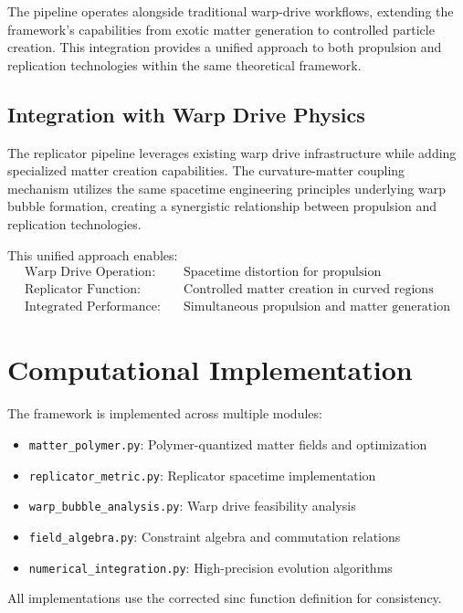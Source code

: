 \documentclass[11pt]{article}
\begin{document}
The pipeline operates alongside traditional warp-drive workflows, extending the framework's capabilities from exotic matter generation to controlled particle creation. This integration provides a unified approach to both propulsion and replication technologies within the same theoretical framework.

\subsection{Integration with Warp Drive Physics}

The replicator pipeline leverages existing warp drive infrastructure while adding specialized matter creation capabilities. The curvature-matter coupling mechanism utilizes the same spacetime engineering principles underlying warp bubble formation, creating a synergistic relationship between propulsion and replication technologies.

This unified approach enables:
\begin{align}
\text{Warp Drive Operation:} &\quad \text{Spacetime distortion for propulsion} \\
\text{Replicator Function:} &\quad \text{Controlled matter creation in curved regions} \\
\text{Integrated Performance:} &\quad \text{Simultaneous propulsion and matter generation}
\end{align}

\section{Computational Implementation}

The framework is implemented across multiple modules:

\begin{itemize}
\item \texttt{matter\_polymer.py}: Polymer-quantized matter fields and optimization
\item \texttt{replicator\_metric.py}: Replicator spacetime implementation
\item \texttt{warp\_bubble\_analysis.py}: Warp drive feasibility analysis
\item \texttt{field\_algebra.py}: Constraint algebra and commutation relations
\item \texttt{numerical\_integration.py}: High-precision evolution algorithms
\end{itemize}

All implementations use the corrected sinc function definition for consistency.
\end{document}
